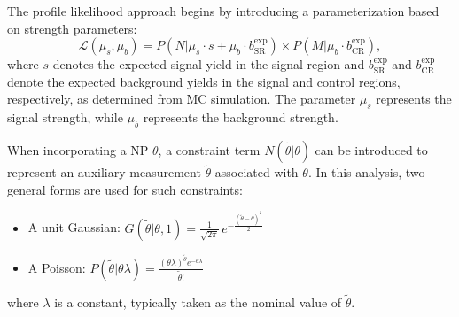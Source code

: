 The profile likelihood approach begins by introducing a parameterization based on strength parameters:
\begin{equation}\label{eq:likelihood_parameterization}
\mathcal{L}(\mu_{s}, \mu_{b}) = P(N| \mu_{s} \cdot s + \mu_{b} \cdot b^{\mathrm{exp}}_{\mathrm{SR}}) \times P(M|\mu_{b} \cdot b_{\mathrm{CR}}^{\mathrm{exp}}),
\end{equation}
where $s$ denotes the expected signal yield in the signal region and $b^{\mathrm{exp}}_{\mathrm{SR}}$ and $b^{\mathrm{exp}}_{\mathrm{CR}}$ denote the expected background yields in the signal and control regions, respectively, as determined from MC simulation. The parameter $\mu_{s}$ represents the signal strength, while $\mu_{b}$ represents the background strength.

When incorporating a NP $\theta$, a constraint term $N(\tilde{\theta}|\theta)$ can be introduced to represent an auxiliary measurement $\tilde{\theta}$ associated with $\theta$. In this analysis, two general forms are used for such constraints:
\begin{itemize}
  \item A unit Gaussian: $G(\tilde{\theta}|\theta,1) = \frac{1}{\sqrt{2\pi}} \, e^{-\frac{{(\tilde{\theta}-\theta)}^{2}}{2}}$
  \item A Poisson: $P(\tilde{\theta}|\theta \lambda) = \frac{{(\theta \lambda)}^{\tilde{\theta}} e^{-\theta \lambda}}{\tilde{\theta}!}$
\end{itemize}
where $\lambda$ is a constant, typically taken as the nominal value of $\tilde{\theta}$.


